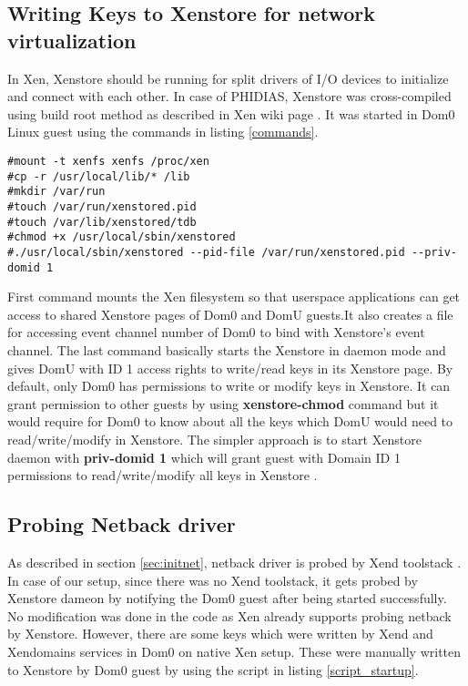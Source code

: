 \subsection{Writing Keys to Xenstore for network virtualization \label{sec:keys}}
In Xen, Xenstore should be running for split drivers of I/O devices to initialize and connect with each other. In case of PHIDIAS, Xenstore was cross-compiled using build root method as described in Xen wiki page \cite{cross_compile}. It was started in Dom0 Linux guest using the commands in listing \ref{commands}.

\begin{lstlisting}[caption= Commands for startin Xenstore dameon in Dom0 on PHIDIAS , label={commands},]
#mount -t xenfs xenfs /proc/xen
#cp -r /usr/local/lib/* /lib
#mkdir /var/run
#touch /var/run/xenstored.pid
#touch /var/lib/xenstored/tdb
#chmod +x /usr/local/sbin/xenstored
#./usr/local/sbin/xenstored --pid-file /var/run/xenstored.pid --priv-domid 1

\end{lstlisting}

First command mounts the Xen filesystem so that userspace applications can get access to shared Xenstore pages  of Dom0 and DomU guests.It also creates a file for accessing event channel number of Dom0 to bind with Xenstore's event channel. The last command basically starts the Xenstore in daemon mode and gives DomU with ID 1 access rights to write/read keys in its Xenstore page. By default, only Dom0 has permissions to write or modify keys in Xenstore. It can grant permission to other guests by using \textbf{xenstore-chmod} command but it would require for Dom0 to know about all the keys which DomU would need to read/write/modify in Xenstore. The simpler approach is to start Xenstore daemon with \textbf{priv-domid 1} which will grant guest with Domain ID 1 permissions to read/write/modify all keys in Xenstore .

\subsection{Probing Netback driver \label{sec:probenetback}}
As described in section \ref{sec:initnet}, netback driver is probed by Xend toolstack . In case of our setup, since there was no Xend toolstack, it gets probed by Xenstore dameon by notifying the Dom0 guest after being started successfully. No modification was done in the code as Xen already supports  probing netback by Xenstore. However, there are some keys which were written by Xend and Xendomains services in Dom0 on native Xen setup. These were manually written to Xenstore by Dom0 guest by using the script in listing \ref{script_startup}.


